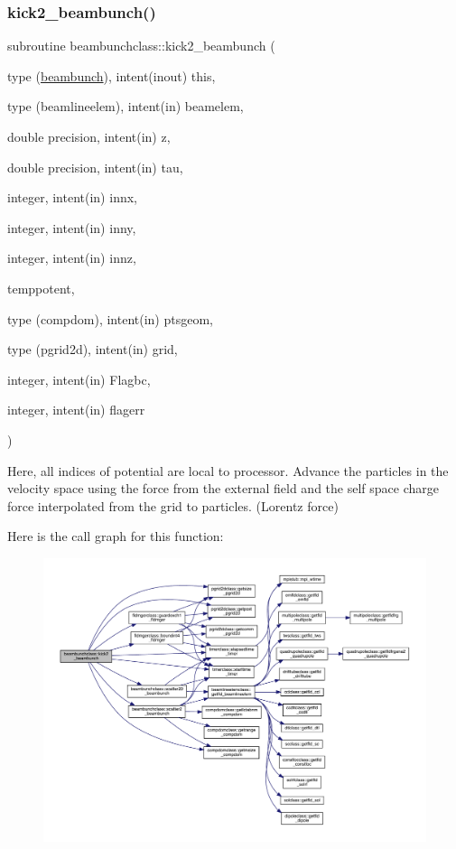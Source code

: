 \subsubsection{\texorpdfstring{kick2\_beambunch()}{kick2\_beambunch()}}
{\footnotesize\ttfamily subroutine beambunchclass\+::kick2\+\_\+beambunch (\begin{DoxyParamCaption}\item[{type (\mbox{\hyperlink{namespacebeambunchclass_structbeambunchclass_1_1beambunch}{beambunch}}), intent(inout)}]{this,  }\item[{type (beamlineelem), intent(in)}]{beamelem,  }\item[{double precision, intent(in)}]{z,  }\item[{double precision, intent(in)}]{tau,  }\item[{integer, intent(in)}]{innx,  }\item[{integer, intent(in)}]{inny,  }\item[{integer, intent(in)}]{innz,  }\item[{}]{temppotent,  }\item[{type (compdom), intent(in)}]{ptsgeom,  }\item[{type (pgrid2d), intent(in)}]{grid,  }\item[{integer, intent(in)}]{Flagbc,  }\item[{integer, intent(in)}]{flagerr }\end{DoxyParamCaption})}



Here, all indices of potential are local to processor. Advance the particles in the velocity space using the force from the external field and the self space charge force interpolated from the grid to particles. (Lorentz force) 

Here is the call graph for this function\+:\nopagebreak
\begin{figure}[H]
\begin{center}
\leavevmode
\includegraphics[width=350pt]{namespacebeambunchclass_a398a8735bfae34f0d7a9337c8e5ec621_cgraph}
\end{center}
\end{figure}
\mbox{\label{namespacebeambunchclass_a530cca8371b8decda64389ce29d10bcd}} 
